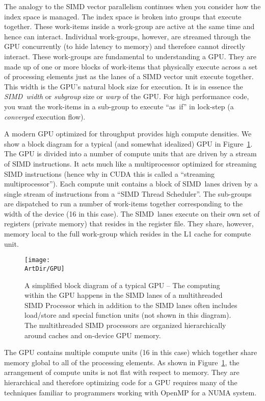 The analogy to the SIMD vector parallelism continues when you consider how the index space is managed.  The 
index space is broken into groups that execute together.  These work-items inside a work-group are active
at the same time and hence can interact.  Individual work-groups, however, are streamed through the 
GPU concurrently (to hide latency to memory) and therefore cannot directly interact.   These work-groups
are fundamental to understanding a GPU.  They are made up of one or more blocks of work-items that 
physically execute across a set of processing elements just as the lanes of a SIMD vector unit execute
together.  This width is the GPU's natural block size for execution.  It is in essence the \emph{SIMD~width} or
\emph{subgroup} size or \emph{warp} of the GPU.  For high performance code, you want the work-items in a sub-group
to execute ``as~if'' in lock-step (a \emph{converged} execution flow).

A modern GPU optimized for throughput provides high compute densities.  We show a block diagram 
for a typical (and somewhat idealized) GPU in Figure~\ref{figure:GPU}. The GPU is divided into a number
 of compute units that are driven by a stream of SIMD instructions.  It acts much like a multiprocessor 
 optimized for streaming SIMD instructions (hence why in CUDA this is called a ``streaming multiprocessor'').
 Each compute unit contains a block of SIMD~lanes
driven by a single stream of instructions from a ``SIMD Thread Scheduler''.  The sub-groups
are dispatched to run a number of work-items together corresponding to the width
of the device (16 in this case).  The SIMD~lanes execute on their own set of registers (private memory)
that resides in the register file.  They share, however, memory local to the full work-group which resides 
in the L1 cache for compute unit.

\begin{figure}[!htbp]
\centerline{\texttt{[image: \\ArtDir/GPU]}}
\caption{A simplified block diagram of a typical GPU -- \small The computing within the GPU happens in the
SIMD lanes of a multithreaded SIMD Processor which in addition to the SIMD lanes often includes
load/store and special function units (not shown in this diagram).   The multithreaded SIMD processors
are organized hierarchically around caches and on-device GPU memory.}
\label{figure:GPU}
\end{figure}

The GPU contains multiple compute units (16 in this case) which together share memory global to 
all of the processing elements.  As shown in Figure~\ref{figure:GPU}, the arrangement of compute units
is not flat with respect to memory.   They are hierarchical and therefore optimizing code for a GPU requires
many of the techniques familiar to programmers working with OpenMP for a NUMA system.

